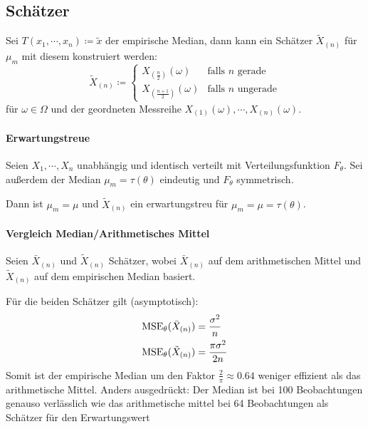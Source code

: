 		\subsection{Schätzer}
			Sei \( T(x_1, \cdots, x_n) \coloneqq \tilde{x} \) der empirische Median, dann kann ein Schätzer \( \tilde{X}_{(n)} \) für \(\mu_m\) mit diesem konstruiert werden:
			\begin{equation*}
				\tilde{X}_{(n)} \coloneqq
				\begin{cases}
					X_{(\frac{n}{2})}(\omega)     & \textrm{falls } n \textrm{ gerade}   \\
					X_{(\frac{n + 1}{2})}(\omega) & \textrm{falls } n \textrm{ ungerade}
				\end{cases}
			\end{equation*}
			für \( \omega \in \Omega \) und der geordneten Messreihe \( X_{(1)}(\omega), \cdots, X_{(n)}(\omega) \).

			\paragraph{Erwartungstreue}
				Seien \(X_1, \cdots, X_n\) unabhängig und identisch verteilt mit Verteilungsfunktion \( F_\theta \). Sei außerdem der Median \( \mu_m = \tau(\theta) \) eindeutig und \( F_\theta \) symmetrisch.

				Dann ist \( \mu_m = \mu \) und \( \tilde{X}_{(n)} \) ein erwartungstreu für \( \mu_m = \mu = \tau(\theta) \).

			\paragraph{Vergleich Median/Arithmetisches Mittel}
				Seien \( \bar{X}_{(n)} \) und \( \tilde{X}_{(n)} \) Schätzer, wobei \( \bar{X}_{(n)} \) auf dem arithmetischen Mittel und \( \tilde{X}_{(n)} \) auf dem empirischen Median basiert.

				Für die beiden Schätzer gilt (asymptotisch):
				\begin{align*}
					\operatorname{MSE}_\theta(\bar{X}_{(n)})   & = \frac{\sigma^2}{n}      \\
					\operatorname{MSE}_\theta(\tilde{X}_{(n)}) & = \frac{\pi \sigma^2}{2n}
				\end{align*}
				Somit ist der empirische Median um den Faktor \( \frac{2}{\pi} \approx 0.64 \) weniger effizient als das arithmetische Mittel. Anders ausgedrückt: Der Median ist bei 100 Beobachtungen genauso verlässlich wie das arithmetische mittel bei 64 Beobachtungen als Schätzer für den Erwartungswert

